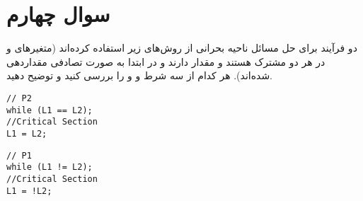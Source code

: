 \section{سوال چهارم}

دو فرآیند برای حل مسائل ناحیه بحرانی از روش‌های زیر استفاده کرده‌اند (متغیرهای  و  در هر دو مشترک هستند و مقدار  دارند و در ابتدا به صورت تصادفی مقداردهی شده‌اند). هر کدام از سه شرط  و  و  را بررسی کنید و توضیح دهید.





\begin{multicols}{2}
\centering
\begin{latin}
\begin{lstlisting}[caption=Code of Q4, label=cpp_code_example]
// P2
while (L1 == L2);
//Critical Section
L1 = L2;
\end{lstlisting}
\end{latin}
\begin{latin}
\begin{lstlisting}[caption=Code of Q4, label=cpp_code_example]
// P1
while (L1 != L2);
//Critical Section
L1 = !L2;
\end{lstlisting}
\end{latin}	
\end{multicols}






